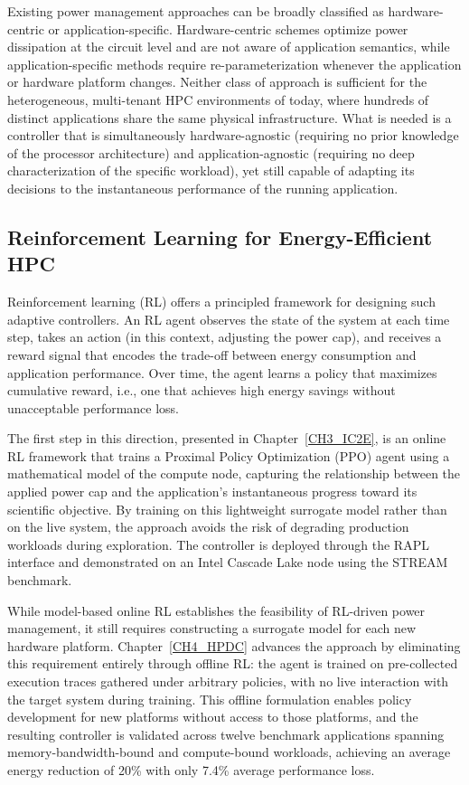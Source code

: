 Existing power management approaches can be broadly classified as hardware-centric
or application-specific.
Hardware-centric schemes optimize power dissipation at the circuit level and are not
aware of application semantics, while application-specific methods require
re-parameterization whenever the application or hardware platform changes.
Neither class of approach is sufficient for the heterogeneous, multi-tenant HPC
environments of today, where hundreds of distinct applications share the same physical
infrastructure.
What is needed is a controller that is simultaneously hardware-agnostic (requiring no
prior knowledge of the processor architecture) and application-agnostic (requiring no
deep characterization of the specific workload), yet still capable of adapting its
decisions to the instantaneous performance of the running application.

\subsection*{Reinforcement Learning for Energy-Efficient HPC}

Reinforcement learning (RL) offers a principled framework for designing such adaptive
controllers.
An RL agent observes the state of the system at each time step, takes an action (in
this context, adjusting the power cap), and receives a reward signal that encodes the
trade-off between energy consumption and application performance.
Over time, the agent learns a policy that maximizes cumulative reward, i.e., one that
achieves high energy savings without unacceptable performance loss.

The first step in this direction, presented in Chapter~\ref{CH3_IC2E}, is an
online RL framework that trains a Proximal Policy Optimization (PPO) agent using a
mathematical model of the compute node, capturing the relationship between the applied
power cap and the application's instantaneous progress toward its scientific objective.
By training on this lightweight surrogate model rather than on the live system, the
approach avoids the risk of degrading production workloads during exploration.
The controller is deployed through the RAPL interface and demonstrated on an Intel
Cascade Lake node using the STREAM benchmark.

While model-based online RL establishes the feasibility of RL-driven power management,
it still requires constructing a surrogate model for each new hardware platform.
Chapter~\ref{CH4_HPDC} advances the approach by eliminating this requirement entirely
through offline RL: the agent is trained on pre-collected execution traces gathered
under arbitrary policies, with no live interaction with the target system during
training.
This offline formulation enables policy development for new platforms without access to
those platforms, and the resulting controller is validated across twelve benchmark
applications spanning memory-bandwidth-bound and compute-bound workloads, achieving
an average energy reduction of 20\% with only 7.4\% average performance loss.

